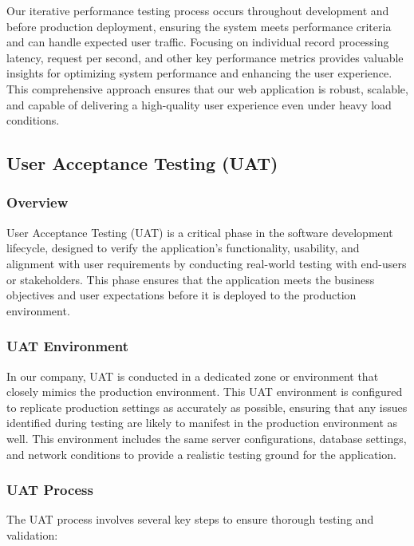 \documentclass[12pt,a4paper]{report}
\begin{document}
Our iterative performance testing process occurs throughout development and before production deployment, ensuring the system meets performance criteria and can handle expected user traffic. Focusing on individual record processing latency, request per second, and other key performance metrics provides valuable insights for optimizing system performance and enhancing the user experience. This comprehensive approach ensures that our web application is robust, scalable, and capable of delivering a high-quality user experience even under heavy load conditions.



\subsection{User Acceptance Testing (UAT)}

\subsubsection{Overview}

User Acceptance Testing (UAT) is a critical phase in the software development lifecycle, designed to verify the application's functionality, usability, and alignment with user requirements by conducting real-world testing with end-users or stakeholders. This phase ensures that the application meets the business objectives and user expectations before it is deployed to the production environment.

\subsubsection{UAT Environment}

In our company, UAT is conducted in a dedicated zone or environment that closely mimics the production environment. This UAT environment is configured to replicate production settings as accurately as possible, ensuring that any issues identified during testing are likely to manifest in the production environment as well. This environment includes the same server configurations, database settings, and network conditions to provide a realistic testing ground for the application.

\subsubsection{UAT Process}

The UAT process involves several key steps to ensure thorough testing and validation:
\end{document}
